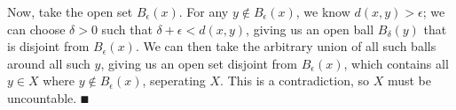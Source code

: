 \documentclass{article}
\begin{document}
Now, take the open set $B_\epsilon(x)$. For any $y \notin B_\epsilon(x)$, we know $d(x, y) > \epsilon$; we can choose $\delta > 0$ such that $\delta + \epsilon < d(x, y)$, giving us an open ball $B_\delta(y)$ that is disjoint from $B_\epsilon(x)$. We can then take the arbitrary union of all such balls around all such $y$, giving us an open set disjoint from $B_\epsilon(x)$, which contains all $y \in X$ where $y \notin B_\epsilon(x)$, seperating $X$. This is a contradiction, so $X$ must be uncountable. $\QED$

\section{}
\end{document}
